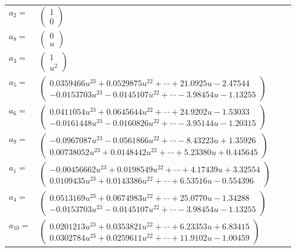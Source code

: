 \documentclass[1p]{elsarticle_modified}
\theoremstyle{definition}
\begin{document}
\begin{tabular}{m{7pt} m{180pt} m{7pt} m{180pt} }
\flushright $a_{2}=$&$\begin{pmatrix}1\\0\end{pmatrix}$ \\
\flushright $a_{8}=$&$\begin{pmatrix}0\\u\end{pmatrix}$ \\
\flushright $a_{3}=$&$\begin{pmatrix}1\\u^2\end{pmatrix}$ \\
\flushright $a_{5}=$&$\begin{pmatrix}0.0359466 u^{23}+0.0529875 u^{22}+\cdots+21.0925 u-2.47544\\-0.0153703 u^{23}-0.0145107 u^{22}+\cdots-3.98454 u-1.13255\end{pmatrix}$ \\
\flushright $a_{6}=$&$\begin{pmatrix}0.0411054 u^{23}+0.0645644 u^{22}+\cdots+24.9202 u-1.53033\\-0.0161448 u^{23}-0.0160826 u^{22}+\cdots-3.95144 u-1.20315\end{pmatrix}$ \\
\flushright $a_{9}=$&$\begin{pmatrix}-0.0967087 u^{23}-0.0561866 u^{22}+\cdots-8.43223 u+1.35926\\0.00738052 u^{23}+0.0148442 u^{22}+\cdots+5.23380 u+0.445645\end{pmatrix}$ \\
\flushright $a_{1}=$&$\begin{pmatrix}-0.00456662 u^{23}+0.0198549 u^{22}+\cdots+4.17439 u+3.32554\\0.0109435 u^{23}+0.0143386 u^{22}+\cdots+6.53516 u-0.554396\end{pmatrix}$ \\
\flushright $a_{4}=$&$\begin{pmatrix}0.0513169 u^{23}+0.0674983 u^{22}+\cdots+25.0770 u-1.34288\\-0.0153703 u^{23}-0.0145107 u^{22}+\cdots-3.98454 u-1.13255\end{pmatrix}$ \\
\flushright $a_{10}=$&$\begin{pmatrix}0.0201213 u^{23}+0.0353821 u^{22}+\cdots+6.23353 u+6.83415\\0.0302784 u^{23}+0.0259611 u^{22}+\cdots+11.9102 u-1.00459\end{pmatrix}$ \\

\end{tabular}
\end{document}

